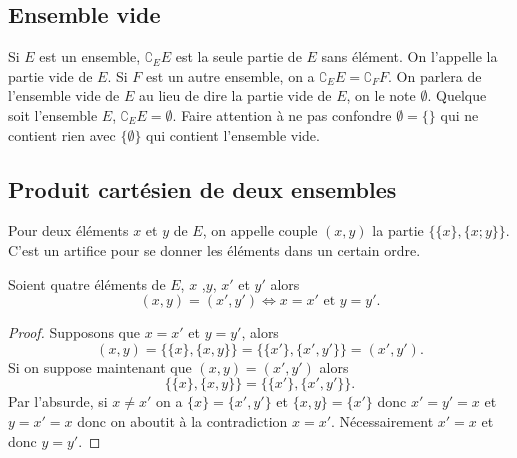 \subsection{Ensemble vide}
\label{chap3-subsec:ensemblevide}

Si \(E\) est un ensemble, \(\complement_E E\) est la seule partie de \(E\) sans 
élément. On l'appelle la partie vide de \(E\). Si \(F\) est un autre ensemble, 
on a \(\complement_E E = \complement_F F\). On parlera de l'ensemble vide de 
\(E\) au lieu de dire la partie vide de \(E\), on le note \(\emptyset\). Quelque 
soit l'ensemble \(E\), \(\complement_E E  = \emptyset\).
Faire attention à ne pas confondre \(\emptyset = \{\}\) qui ne contient rien 
avec \(\{\emptyset\}\) qui contient l'ensemble vide.

\subsection{Produit cartésien de deux ensembles}
\label{chap3-subsec:prodcart}

\begin{defdef}
    Pour deux éléments \(x\) et \(y\) de \(E\), on appelle couple \((x,y)\) la 
    partie \(\{\{x\},\{x;y\}\}\). C'est un artifice pour se donner les éléments dans 
    un certain ordre.
\end{defdef}

\begin{prop}
    Soient quatre éléments de \(E\), \(x\) ,\(y\), \(x'\) et \(y'\) alors 
    \begin{equation} 
        (x,y) = (x',y') \iff  x = x' \text{~et~} y = y'.
    \end{equation}
\end{prop}
\begin{proof}
    Supposons que \(x = x'\) et \(y = y'\), alors 
    \begin{equation*}
        (x,y) = \{\{x\},\{x,y\}\} = \{\{x'\},\{x',y'\}\} = (x',y').
    \end{equation*}
    Si on suppose maintenant que \((x,y) = (x',y')\) alors 
    \begin{equation*}
        \{\{x\},\{x,y\}\} = \{\{x'\},\{x',y'\}\}.
    \end{equation*}
    Par l'absurde, si \(x \neq x'\) on a \(\{x\} = \{x',y'\}\) et \(\{x,y\} = \{x'\}\) 
    donc \(x'=y' = x\) et \(y = x' = x\) donc on aboutit à la contradiction \(x = x'\). 
    Nécessairement \(x' = x\) et donc \(y = y'\).
\end{proof}

